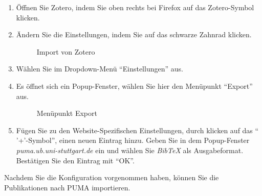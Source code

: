 \begin{enumerate}
    \item Öffnen Sie Zotero, indem Sie oben rechts bei Firefox auf das Zotero-Symbol klicken.
    \item Ändern Sie die Einstellungen, indem Sie auf das schwarze Zahnrad klicken. 
\begin{figure}[h!]
 \centering
 \caption{Import von Zotero}
 \label{figure051}
\end{figure}
    \item Wählen Sie im Dropdown-Menü \enquote{Einstellungen} aus.
    \item Es öffnet sich ein Popup-Fenster, wählen Sie hier den Menüpunkt \enquote{Export} aus.
\begin{figure}[h!]
 \centering
 \caption{Menüpunkt Export}
 \label{figure052}
\end{figure} 
    \item Fügen Sie zu den Website-Spezifischen Einstellungen, durch klicken auf das \enquote{ '+'-Symbol}, einen neuen Eintrag hinzu. Geben Sie in dem Popup-Fenster \textit{puma.ub.uni-stuttgart.de} ein und wählen Sie \textit{BibTeX} als Ausgabeformat. Bestätigen Sie den Eintrag mit \enquote{OK}. 
\end{enumerate}
Nachdem Sie die Konfiguration vorgenommen haben, können Sie die Publikationen nach PUMA importieren. 
